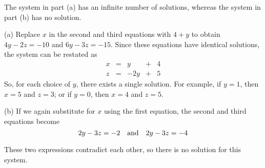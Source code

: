 \documentclass{ximera}
\begin{document}
\begin{exercise}
\begin{solution}

\ans The system in part (a) has an infinite number of solutions, whereas
the system in part (b) has no solution.

\soln (a) Replace $x$ in the second and third equations with
$4 + y$ to obtain $4y - 2z = -10$ and $6y - 3z = -15$.  Since these
equations have identical solutions, the system can be restated as
\[
\begin{array}{rrrrrrr}
x & = & y & + & 4 \\ 
z & = & -2y & + & 5\end{array}
\]
So, for each choice of $y$, there exists a single solution.  For
example, if $y = 1$, then $x = 5$ and $z = 3$; or if $y = 0$, then
$x = 4$ and $z = 5$.

(b) If we again substitute for $x$ using the first equation, the
second and third equations become
\[
2y - 3z = -2 \quad\mbox{and}\quad 2y - 3z = -4
\]

These two expressions contradict each other, so there is no solution
for this system.


\end{solution}
\end{exercise}
\end{document}
